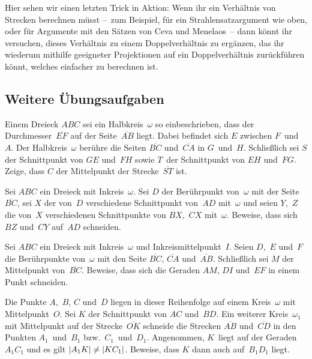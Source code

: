 Hier sehen wir einen letzten Trick in Aktion: Wenn ihr ein Verhältnis von Strecken berechnen müsst --~zum Beispiel, für ein Strahlensatzargument wie oben, oder für Argumente mit den Sätzen von Ceva und Menelaos~-- dann könnt ihr versuchen, dieses Verhältnis zu einem Doppelverhältnis zu ergänzen, das ihr wiederum mithilfe geeigneter Projektionen auf ein Doppelverhältnis zurückführen könnt, welches einfacher zu berechnen ist.

\subsection*{Weitere Übungsaufgaben}
\begin{aufgabe*}
	Einem Dreieck $ABC$ sei ein Halbkreis~$\omega$ so einbeschrieben, dass der Durchmesser~$\overline{EF}$ auf der Seite~$\overline{AB}$ liegt. Dabei befindet sich $E$ zwischen $F$~und~$A$. Der Halbkreis~$\omega$ berühre die Seiten $\overline{BC}$ und~$\overline{CA}$ in $G$~und~$H$. Schließlich sei $S$ der Schnittpunkt von $GE$ und~$FH$ sowie $T$~der Schnittpunkt von $EH$ und~$FG$. Zeige, dass $C$ der Mittelpunkt der Strecke~$\overline{ST}$ ist.
\end{aufgabe*}

\begin{aufgabe*}
	Sei $ABC$ ein Dreieck mit Inkreis~$\omega$. Sei $D$ der Berührpunkt von~$\omega$ mit der Seite~$\overline{BC}$, sei $X$ der von~$D$ verschiedene Schnittpunkt von~$AD$ mit~$\omega$ und seien $Y$,~$Z$ die von~$X$ verschiedenen Schnittpunkte von $BX$,~$CX$ mit~$\omega$. Beweise, dass sich $BZ$ und~$CY$ auf~$AD$ schneiden.
\end{aufgabe*}

\begin{aufgabe*}[*]
	Sei $ABC$ ein Dreieck mit Inkreis~$\omega$ und Inkreismittelpunkt~$I$. Seien $D$,~$E$ und~$F$ die Berührpunkte von~$\omega$ mit den Seite $\overline{BC}$, $\overline{CA}$ und~$\overline{AB}$. Schließlich sei $M$ der Mittelpunkt von~$\overline{BC}$. Beweise, dass sich die Geraden $AM$, $DI$ und~$EF$ in einem Punkt schneiden.
\end{aufgabe*}

\begin{aufgabe*}[*]
	Die Punkte $A$,~$B$, $C$ und~$D$ liegen in dieser Reihenfolge auf einem Kreis~$\omega$ mit Mittelpunkt~$O$. Sei $K$ der Schnittpunkt von $AC$ und~$BD$. Ein weiterer Kreis~$\omega_1$ mit Mittelpunkt auf der Strecke~$\overline{OK}$ schneide die Strecken $\overline{AB}$ und~$\overline{CD}$ in den Punkten $A_1$~und~$B_1$ bzw.\ $C_1$~und~$D_1$. Angenommen, $K$~liegt auf der Geraden~$A_1C_1$ und es gilt $\abs*{A_1K}\neq \abs*{KC_1}$. 
	Beweise, dass $K$ dann auch auf~$B_1D_1$ liegt.
\end{aufgabe*}

